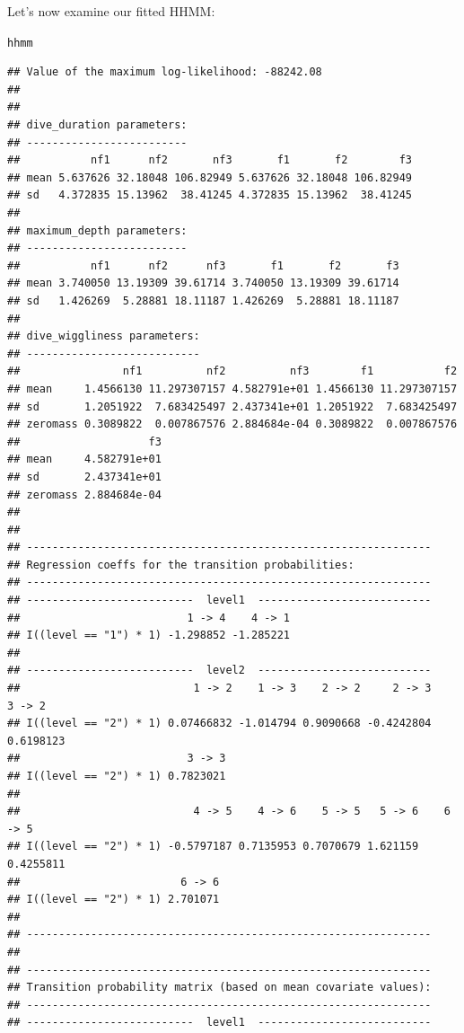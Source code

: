 \documentclass[12pt]{article}\usepackage[]{graphicx}\usepackage[]{xcolor}
\makeatletter
\newcommand{\hlstd}[1]{\textcolor[rgb]{0.345,0.345,0.345}{#1}}%
\newenvironment{kframe}{%
 \def\at@end@of@kframe{}%
 \ifinner\ifhmode%
  \def\at@end@of@kframe{\end{minipage}}%
  \begin{minipage}{\columnwidth}%
 \fi\fi%
 \def\FrameCommand##1{\hskip\@totalleftmargin \hskip-\fboxsep
 \colorbox{shadecolor}{##1}\hskip-\fboxsep
     \hskip-\linewidth \hskip-\@totalleftmargin \hskip\columnwidth}%
 \MakeFramed {\advance\hsize-\width
   \@totalleftmargin\z@ \linewidth\hsize
   \@setminipage}}%
 {\par\unskip\endMakeFramed%
 \at@end@of@kframe}
\newenvironment{knitrout}{}{} %
\makeatother
\begin{document}
Let's now examine our fitted HHMM:
\begin{knitrout}
\color{fgcolor}\begin{kframe}
\begin{alltt}
\hlstd{hhmm}
\end{alltt}
\begin{verbatim}
## Value of the maximum log-likelihood: -88242.08 
## 
## 
## dive_duration parameters:
## -------------------------
##           nf1      nf2       nf3       f1       f2        f3
## mean 5.637626 32.18048 106.82949 5.637626 32.18048 106.82949
## sd   4.372835 15.13962  38.41245 4.372835 15.13962  38.41245
## 
## maximum_depth parameters:
## -------------------------
##           nf1      nf2      nf3       f1       f2       f3
## mean 3.740050 13.19309 39.61714 3.740050 13.19309 39.61714
## sd   1.426269  5.28881 18.11187 1.426269  5.28881 18.11187
## 
## dive_wiggliness parameters:
## ---------------------------
##                nf1          nf2          nf3        f1           f2
## mean     1.4566130 11.297307157 4.582791e+01 1.4566130 11.297307157
## sd       1.2051922  7.683425497 2.437341e+01 1.2051922  7.683425497
## zeromass 0.3089822  0.007867576 2.884684e-04 0.3089822  0.007867576
##                    f3
## mean     4.582791e+01
## sd       2.437341e+01
## zeromass 2.884684e-04
## 
## 
## ---------------------------------------------------------------
## Regression coeffs for the transition probabilities:
## ---------------------------------------------------------------
## --------------------------  level1  ---------------------------
##                          1 -> 4    4 -> 1
## I((level == "1") * 1) -1.298852 -1.285221
## 
## --------------------------  level2  ---------------------------
##                           1 -> 2    1 -> 3    2 -> 2     2 -> 3    3 -> 2
## I((level == "2") * 1) 0.07466832 -1.014794 0.9090668 -0.4242804 0.6198123
##                          3 -> 3
## I((level == "2") * 1) 0.7823021
## 
##                           4 -> 5    4 -> 6    5 -> 5   5 -> 6    6 -> 5
## I((level == "2") * 1) -0.5797187 0.7135953 0.7070679 1.621159 0.4255811
##                         6 -> 6
## I((level == "2") * 1) 2.701071
## 
## ---------------------------------------------------------------
## 
## ---------------------------------------------------------------
## Transition probability matrix (based on mean covariate values):
## ---------------------------------------------------------------
## --------------------------  level1  ---------------------------

\end{verbatim}
\end{kframe}
\end{knitrout}
\end{document}
